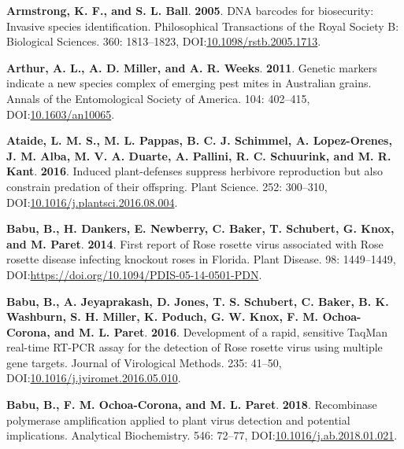 \documentclass[12pt,final,CPage]{ufthesis}
\newlength{\cslhangindent}
\newenvironment{CSLReferences}[2] %
{%
	\setlength{\parindent}{0pt}
	\ifodd #1 \everypar{\setlength{\hangindent}{\cslhangindent}}\ignorespaces\fi
	\ifnum #2 > 0
	\setlength{\parskip}{#2\baselineskip}
	\fi
}%
{}
\begin{document}
{\begin{CSLReferences}{1}{0}
  \leavevmode{}%
  \textbf{Armstrong, K. F., and S. L. Ball}. \textbf{2005}. {DNA} barcodes for biosecurity: Invasive species identification. Philosophical Transactions of the Royal Society B: Biological Sciences. 360: 1813--1823, DOI:\href{https://doi.org/10.1098/rstb.2005.1713}{10.1098/rstb.2005.1713}.

  \leavevmode{}%
  \textbf{Arthur, A. L., A. D. Miller, and A. R. Weeks}. \textbf{2011}. Genetic markers indicate a new species complex of emerging pest mites in {Australian} grains. Annals of the Entomological Society of America. 104: 402--415, DOI:\href{https://doi.org/10.1603/an10065}{10.1603/an10065}.

  \leavevmode{}%
  \textbf{Ataide, L. M. S., M. L. Pappas, B. C. J. Schimmel, A. Lopez-Orenes, J. M. Alba, M. V. A. Duarte, A. Pallini, R. C. Schuurink, and M. R. Kant}. \textbf{2016}. Induced plant-defenses suppress herbivore reproduction but also constrain predation of their offspring. Plant Science. 252: 300--310, DOI:\href{https://doi.org/10.1016/j.plantsci.2016.08.004}{10.1016/j.plantsci.2016.08.004}.

  \leavevmode{}%
  \textbf{Babu, B., H. Dankers, E. Newberry, C. Baker, T. Schubert, G. Knox, and M. Paret}. \textbf{2014}. First report of {Rose rosette virus} associated with {Rose rosette disease} infecting knockout roses in {Florida}. Plant Disease. 98: 1449--1449, DOI:\url{https://doi.org/10.1094/PDIS-05-14-0501-PDN}.

  \leavevmode{}%
  \textbf{Babu, B., A. Jeyaprakash, D. Jones, T. S. Schubert, C. Baker, B. K. Washburn, S. H. Miller, K. Poduch, G. W. Knox, F. M. Ochoa-Corona, and M. L. Paret}. \textbf{2016}. Development of a rapid, sensitive {TaqMan} real-time {RT}-{PCR} assay for the detection of {Rose rosette virus} using multiple gene targets. Journal of Virological Methods. 235: 41--50, DOI:\href{https://doi.org/10.1016/j.jviromet.2016.05.010}{10.1016/j.jviromet.2016.05.010}.

  \leavevmode{}%
  \textbf{Babu, B., F. M. Ochoa-Corona, and M. L. Paret}. \textbf{2018}. Recombinase polymerase amplification applied to plant virus detection and potential implications. Analytical Biochemistry. 546: 72--77, DOI:\href{https://doi.org/10.1016/j.ab.2018.01.021}{10.1016/j.ab.2018.01.021}.


\end{CSLReferences}}
\end{document}
